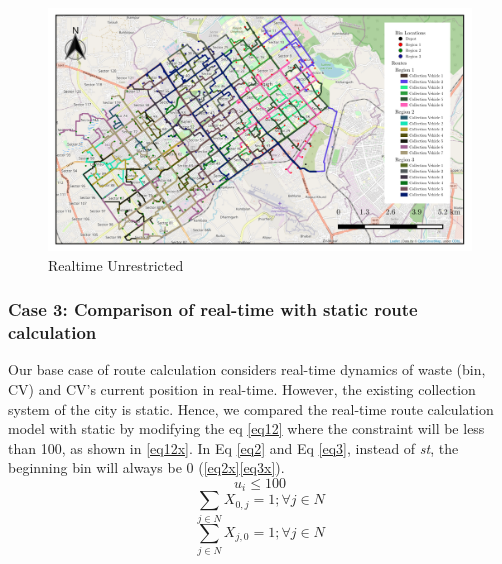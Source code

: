 \documentclass[12pt]{article}
\begin{document}

 

\begin{figure}[H]
    \centering
    \includegraphics[scale=0.55]{Dynamic_weighted_unrestricted.png} %
    \caption{Realtime Unrestricted}\label{fig2}
\end{figure}


\subsubsection*{Case 3: Comparison of real-time with static route calculation}

Our base case of route calculation considers real-time dynamics of waste (bin, CV) and CV's current position in real-time. However, the existing collection system of the city is static. Hence, we compared the real-time route calculation model with static by modifying the eq \eqref{eq12} where the constraint will be less than 100, as shown in \eqref{eq12x}. In Eq \eqref{eq2} and Eq \eqref{eq3}, instead of \textit{st}, the beginning bin will always be 0
 (\eqref{eq2x}\eqref{eq3x}). 
\begin{equation}\label{eq12x}
    u_i\le 100
\end{equation}
\begin{equation}\label{eq2x}
    \sum_{j\in N}X_{0,j}=1 ; \forall j \in N
\end{equation}
\begin{equation}\label{eq3x}
    \sum_{j\in N}X_{j,0}=1 ; \forall j \in N
\end{equation}
\end{document}
